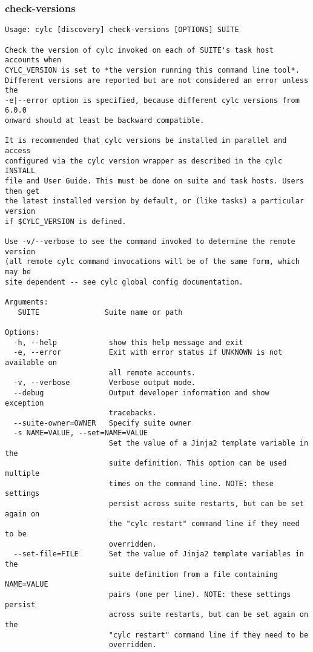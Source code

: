 \subsubsection{check-versions}
\label{check-versions}
\begin{lstlisting}
Usage: cylc [discovery] check-versions [OPTIONS] SUITE 

Check the version of cylc invoked on each of SUITE's task host accounts when
CYLC_VERSION is set to *the version running this command line tool*.
Different versions are reported but are not considered an error unless the
-e|--error option is specified, because different cylc versions from 6.0.0
onward should at least be backward compatible.

It is recommended that cylc versions be installed in parallel and access
configured via the cylc version wrapper as described in the cylc INSTALL
file and User Guide. This must be done on suite and task hosts. Users then get
the latest installed version by default, or (like tasks) a particular version
if $CYLC_VERSION is defined.

Use -v/--verbose to see the command invoked to determine the remote version
(all remote cylc command invocations will be of the same form, which may be
site dependent -- see cylc global config documentation.

Arguments:
   SUITE               Suite name or path

Options:
  -h, --help            show this help message and exit
  -e, --error           Exit with error status if UNKNOWN is not available on
                        all remote accounts.
  -v, --verbose         Verbose output mode.
  --debug               Output developer information and show exception
                        tracebacks.
  --suite-owner=OWNER   Specify suite owner
  -s NAME=VALUE, --set=NAME=VALUE
                        Set the value of a Jinja2 template variable in the
                        suite definition. This option can be used multiple
                        times on the command line. NOTE: these settings
                        persist across suite restarts, but can be set again on
                        the "cylc restart" command line if they need to be
                        overridden.
  --set-file=FILE       Set the value of Jinja2 template variables in the
                        suite definition from a file containing NAME=VALUE
                        pairs (one per line). NOTE: these settings persist
                        across suite restarts, but can be set again on the
                        "cylc restart" command line if they need to be
                        overridden.
\end{lstlisting}
